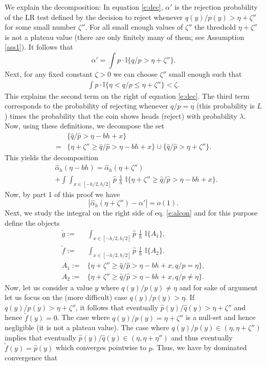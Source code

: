 We explain the decomposition: In equation \eqref{e:dec}, $\alpha'$ is the rejection probability of the LR test defined by the decision to reject whenever $q(y)/p(y)>\eta+\zeta''$ for some small number $\zeta''$. For all small enough values of $\zeta''$ the threshold $\eta+\zeta''$ is not a plateau value (there are only finitely many of them; see Assumption \ref{ass1}). It follows that 
\[
\alpha' = \int p \cdot \mathbb{I}\{q/p  > \eta+\zeta''\}.
\]
Next, for any fixed constant $\zeta>0$ we can choose $\zeta''$ small enough such that
\begin{align} \label{e:int1}
\int p \cdot \mathbb{I}\{\eta <q/p  \le \eta+\zeta''\} < \zeta.
\end{align}
This explains the second term on the right of equation \eqref{e:dec}. The third term corresponds to the probability of rejecting whenever $q/p=\eta$ (this probability is $L$) times the probability that the coin shows heads (reject) with probability $\lambda$.\\
Now, using these definitions, we decompose the set
\begin{align*}
&\{ \hat q /\hat p  > \eta-b h +x\}\\
=& \{ \eta +\zeta'' \ge \hat q /\hat p  > \eta-b h +x\} \cup  \{  \hat q /\hat p  > \eta +\zeta''\}. 
\end{align*}
This yields the decomposition
\begin{align} \label{e:alcon}
& \hat \alpha_h(\eta-b h)
= \hat \alpha_h(\eta+\zeta'')\\
&+ \int  \int_{x \in [-h/2,h/2]}  \hat p \,\, \frac{1}{h}\,\,\mathbb{I}\{ \eta +\zeta'' \ge \hat q /\hat p  > \eta-b h +x\} .\nonumber 
\end{align}
Now, by part 1 of this proof we have  
\[
|\hat \alpha_h(\eta+\zeta'') - \alpha'|=o(1).
\]
 Next, we study the integral on the right side of eq. \eqref{e:alcon} and for this purpose define the objects
\begin{align*}
    \tilde g := & \int_{x \in [-h/2,h/2]}  \hat p \,\,\frac{1}{h}\,\,\mathbb{I}\{ A_1\}, \\
    \tilde f := & \int_{x \in [-h/2,h/2]}  \hat p \,\,\frac{1}{h}\,\,\mathbb{I}\{ A_2\}.\\
    A_1:= &\{\eta +\zeta'' \ge \hat q /\hat p  > \eta-b h +x,q/p=\eta\}, \\
    A_2:=& \{\eta +\zeta'' \ge \hat q /\hat p  > \eta-b h +x,q/p \neq \eta\}.
\end{align*}
Now, let us consider a value $y$ where $q(y)/p(y) \neq \eta$ and for sake of argument let us focus on the (more difficult) case $q(y)/p(y) >\eta$. If $q(y)/p(y) > \eta+\zeta''$, it follows that eventually $\hat p(y)/\hat q(y) > \eta+\zeta''$ and hence $\tilde f(y)=0$. The case where $q(y)/p(y) = \eta+\zeta''$ is a null-set and hence negligible (it is not a plateau value). The case where  $q(y)/p(y) \in (\eta, \eta+\zeta'')$ implies that eventually $\hat p(y)/\hat q(y) \in (\eta, \eta+\eta'')$ and thus eventually $\tilde f(y) = \hat p(y)$ which converges pointwise to $p$. Thus, we have by dominated convergence that 
